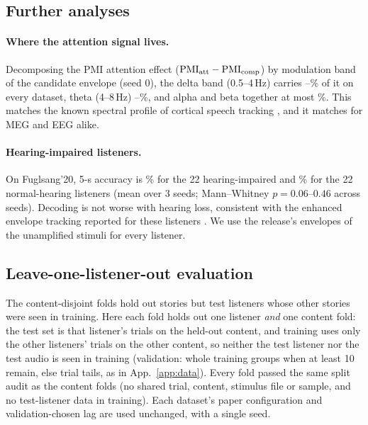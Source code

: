 \documentclass[twoside]{article}
\newcommand{\PMI}{\mathrm{PMI}}
\begin{document}
\FloatBarrier
\subsection{Further analyses}\label{app:further}
\paragraph{Where the attention signal lives.} Decomposing the PMI attention effect
($\PMI_{\rm att}-\PMI_{\rm comp}$) by modulation band of the candidate envelope (seed 0), the delta
band (0.5--4\,Hz) carries \deltaMin--\deltaMax\% of it on every dataset, theta (4--8\,Hz)
\thetaMin--\thetaMax\%, and alpha and beta together at most \abMax\%. This matches the known spectral profile of cortical
speech tracking \citep{ding2012emergence}, and it matches for MEG and EEG alike.

\paragraph{Hearing-impaired listeners.} On Fuglsang'20, 5-s accuracy is \hiAcc\% for the 22
hearing-impaired and \nhAcc\% for the 22 normal-hearing listeners (mean over 3 seeds;
Mann--Whitney $p=0.06$--$0.46$ across seeds). Decoding is not worse with hearing loss,
consistent with the enhanced envelope tracking reported for these listeners
\citep{fuglsang2020effects}. We use the release's envelopes of the unamplified stimuli for every listener.

\FloatBarrier
\subsection{Leave-one-listener-out evaluation}\label{app:loso}
The content-disjoint folds hold out stories but test listeners whose other stories were
seen in training. Here each fold holds out one listener \emph{and} one content fold: the test
set is that listener's trials on the held-out content, and training uses only the other
listeners' trials on the other content, so neither the test listener nor the test audio is
seen in training (validation: whole training groups when at least 10 remain, else trial
tails, as in App.~\ref{app:data}). Every fold passed the same split audit as the content
folds (no shared trial, content, stimulus file or sample, and no test-listener data in
training). Each dataset's paper configuration and validation-chosen lag are used unchanged,
with a single seed.
\end{document}
